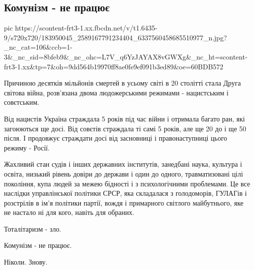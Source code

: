  
 
 
 
 
\subsection{Комунізм - не працює}


\ifcmt
  pic https://scontent-frt3-1.xx.fbcdn.net/v/t1.6435-9/s720x720/183950045_2589167791234404_6337560458685510977_n.jpg?_nc_cat=106&ccb=1-3&_nc_sid=8bfeb9&_nc_ohc=L7V_q6YzJAYAX8vGWXg&_nc_ht=scontent-frt3-1.xx&tp=7&oh=9dd564b19970ff8ae0fe9ef091b3ed89&oe=60BDB572
\fi


Причиною десятків мільйонів смертей в усьому світі в 20 столітті стала Друга
світова війна, розв'язана двома людожерськими режимами - нацистським і
совєтським.

Від нацистів Україна страждала 5 років під час війни і отримала багато ран, які
загоюються ще досі. Від совєтів страждала ті самі 5 років, але ще 20 до і ще 50
після. І продовжує страждати досі від засновниці і правонаступниці цього режиму
- Росії.

Жахливий стан судів і інших державних інститутів, занедбані наука, культура і
освіта, низький рівень довіри до держави і один до одного, травматизовані цілі
покоління, купа людей за межею бідності і з психологічними проблемами. Це все
наслідки управлінської політики СРСР, яка складалася з голодоморів, ГУЛАГів і
розстрілів в ім'я політики партії, вождя і примарного світлого майбутнього, яке
не настало ні для кого, навіть для обраних.

Тоталітаризм - зло.

Комунізм - не працює.

Ніколи. Знову.
